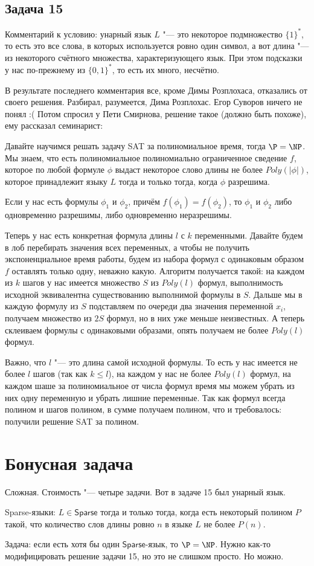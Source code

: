 \subsection{Задача 15}
	Комментарий к условию: унарный язык $L$ "--- это некоторое подмножество $\{1\}^*$,
	то есть это все слова, в которых используется ровно один символ, а вот длина "--- из некоторого
	счётного множества, характеризующего язык.
	При этом подсказки у нас по-прежнему из $\{0,1\}^*$, то есть их много, несчётно.

	В результате последнего комментария все, кроме Димы Розплохаса, отказались от своего решения.
	Разбирал, разумеется, Дима Розплохас.
	Егор Суворов ничего не понял :(
	Потом спросил у Пети Смирнова, решение такое (должно быть похоже), ему рассказал семинарист:

	Давайте научимся решать задачу SAT за полиномиальное время, тогда $\P=\NP$.
	Мы знаем, что есть полиномиальное полиномиально ограниченное сведение $f$,
	которое по любой формуле $\phi$ выдаст некоторое слово длины не более $Poly(|\phi|)$,
	которое принадлежит языку $L$ тогда и только тогда, когда $\phi$ разрешима.
	\begin{assertion}
		Если у нас есть формулы $\phi_1$ и $\phi_2$, причём $f(\phi_1) = f(\phi_2)$,
		то $\phi_1$ и $\phi_2$ либо одновременно разрешимы, либо одновременно неразрешимы.
	\end{assertion}
	Теперь у нас есть конкретная формула длины $l$ с $k$ переменными.
	Давайте будем в лоб перебирать значения всех переменных, а чтобы не получить экспоненциальное
	время работы, будем из набора формул с одинаковым образом $f$ оставлять только одну, неважно какую.
	Алгоритм получается такой: на каждом из $k$ шагов у нас имеется множество $S$ из $Poly(l)$
	формул, выполнимость исходной эквивалентна существованию выполнимой формулы в $S$.
	Дальше мы в каждую формулу из $S$ подставляем по очереди два значения переменной $x_i$,
	получаем множество из $2S$ формул, но в них уже меньше неизвестных.
	А теперь склеиваем формулы с одинаковыми образами, опять получаем не более $Poly(l)$ формул.

	Важно, что $l$ "--- это длина самой исходной формулы.
	То есть у нас имеется не более $l$ шагов (так как $k \le l$), на каждом у нас не более
	$Poly(l)$ формул, на каждом шаше за полиномиальное от числа формул время мы можем убрать из
	них одну переменную и убрать лишние переменные.
	Так как формул всегда полином и шагов полином, в сумме получаем полином, что и требовалось:
	получили решение SAT за полином.

\section{Бонусная задача}
	Сложная. Стоимость "--- четыре задачи.
	Вот в задаче 15 был унарный язык.
	\begin{Def}
		Sparse-языки: $L \in \mathsf{Sparse}$ тогда и только тогда, когда есть некоторый
		полином $P$ такой, что количество слов длины ровно $n$ в языке $L$ не более
		$P(n)$.
	\end{Def}
	Задача: если есть хотя бы один $\mathsf{Sparse}$-язык, то $\P=\NP$.
	Нужно как-то модифицировать решение задачи 15, но это не слишком просто.
	Но можно.
